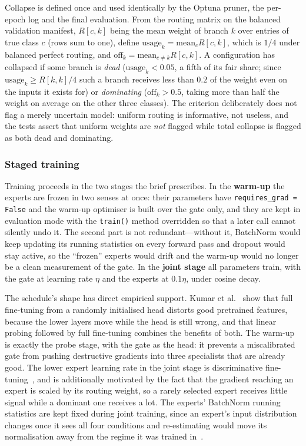 \documentclass[conference]{IEEEtran}
\begin{document}
Collapse is defined once and used identically by the Optuna pruner, the per-epoch
log and the final evaluation. From the routing matrix on the balanced validation
manifest, $R[c,k]$ being the mean weight of branch $k$ over entries of true class
$c$ (rows sum to one), define $\mathrm{usage}_k = \mathrm{mean}_c R[c,k]$, which
is $1/4$ under balanced perfect routing, and
$\mathrm{off}_k = \mathrm{mean}_{c \neq k} R[c,k]$. A configuration has collapsed
if some branch is \emph{dead} ($\mathrm{usage}_k < 0.05$, a fifth of its fair
share; since $\mathrm{usage}_k \geq R[k,k]/4$ such a branch receives less than
$0.2$ of the weight even on the inputs it exists for) or \emph{dominating}
($\mathrm{off}_k > 0.5$, taking more than half the weight on average on the other
three classes). The criterion deliberately does not flag a merely uncertain
model: uniform routing is informative, not useless, and the tests assert that
uniform weights are \emph{not} flagged while total collapse is flagged as both
dead and dominating.

\subsubsection{Staged training}

Training proceeds in the two stages the brief prescribes. In the \textbf{warm-up}
the experts are frozen in two senses at once: their parameters have
\texttt{requires\_grad = False} and the warm-up optimiser is built over the gate
only, and they are kept in evaluation mode with the \texttt{train()} method
overridden so that a later call cannot silently undo it. The second part is not
redundant---without it, BatchNorm would keep updating its running statistics on
every forward pass and dropout would stay active, so the ``frozen'' experts would
drift and the warm-up would no longer be a clean measurement of the gate. In the
\textbf{joint stage} all parameters train, with the gate at learning rate
$\eta$ and the experts at $0.1\eta$, under cosine decay.

The schedule's shape has direct empirical support. Kumar et
al.~\cite{kumar2022finetuning} show that full fine-tuning from a randomly
initialised head distorts good pretrained features, because the lower layers move
while the head is still wrong, and that linear probing followed by full
fine-tuning combines the benefits of both. The warm-up is exactly the probe
stage, with the gate as the head: it prevents a miscalibrated gate from pushing
destructive gradients into three specialists that are already good. The lower
expert learning rate in the joint stage is discriminative
fine-tuning~\cite{howard2018universal}, and is additionally motivated by the fact
that the gradient reaching an expert is scaled by its routing weight, so a
rarely selected expert receives little signal while a dominant one receives a
lot. The experts' BatchNorm running statistics are kept fixed during joint
training, since an expert's input distribution changes once it sees all four
conditions and re-estimating would move its normalisation away from the regime it
was trained in~\cite{he2019rethinking}.
\end{document}
